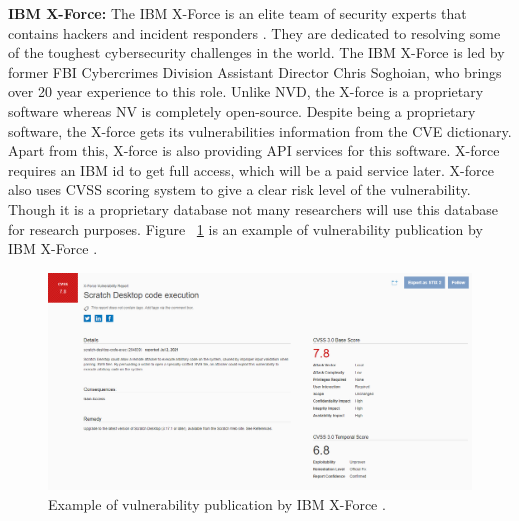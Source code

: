 {\bf IBM X-Force:} The IBM X-Force is an elite team of security experts that contains hackers and incident responders \cite{IbmXforce}. They are dedicated to resolving some of the toughest cybersecurity challenges in the world. The IBM X-Force is led by former FBI Cybercrimes Division Assistant Director Chris Soghoian, who brings over 20 year experience to this role. Unlike \acs{NVD}, the X-force is a proprietary software whereas NV is completely open-source. Despite being a proprietary software, the X-force gets its vulnerabilities information from the \acs{CVE} dictionary. Apart from this, X-force is also providing API services for this software. X-force requires an IBM id to get full access, which will be a paid service later. X-force also uses \acs{CVSS} scoring system to give a clear risk level of the vulnerability. Though it is a proprietary database not many researchers will use this database for research purposes. Figure ~\ref{fig:ibm} is an example of vulnerability publication by IBM X-Force \cite{IbmXforce}.
\newpage
\begin{figure}[H]
	\includegraphics[width=15cm]{includes/ibm.png}
	\centering
	\caption{Example of vulnerability publication by IBM X-Force \cite{IbmXforce}.}
	\label{fig:ibm}
\end{figure}


